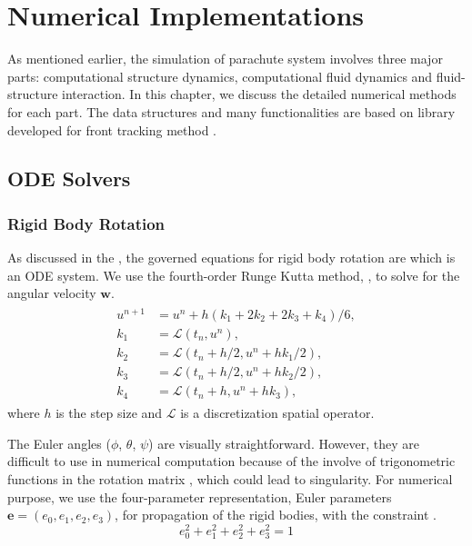 \chapter{Numerical Implementations}
\label{Chap:Numerical}

As mentioned earlier, the simulation of parachute system involves three 
major parts: computational structure dynamics, computational fluid 
dynamics and fluid-structure interaction. 
In this chapter, we discuss the detailed numerical methods for each part. 
The data structures and many functionalities are based on \FronTierp 
library developed for front tracking method \cite{GliGroLi99a,DuFixGli05}.



\section{ODE Solvers}
\label{Sec:ODES}

\subsection{Rigid Body Rotation}
As discussed in the , the governed equations for rigid body 
rotation are  which is an ODE system. 
We use the fourth-order Runge Kutta method, , to solve for the 
angular velocity $\mathbf{w}$. 
\begin{eqnarray}
\begin{aligned}
u^{n+1} &= u^{n} + h(k_{1} + 2k_{2} + 2k_{3} + k_{4})/6, \\
k_{1} &= \mathscr{L}(t_n, u^{n}), \\
k_{2} &= \mathscr{L}(t_n + h/2, u^{n} + hk_{1}/2), \\
k_{3} &= \mathscr{L}(t_n + h/2, u^{n} + hk_{2}/2), \\
k_{4} &= \mathscr{L}(t_n + h, u^{n} + hk_{3}),
\end{aligned}
\label{eqn:4th_RK}
\end{eqnarray}
where $h$ is the step size and $\mathscr{L}$ is a discretization spatial
operator.

The Euler angles ($\phi$, $\theta$, $\psi$) are visually straightforward.
However, they are difficult to use in numerical computation because of the
involve of trigonometric functions in the rotation matrix 
, which could lead to singularity.
For numerical purpose, we use the four-parameter representation, Euler 
parameters $\mathbf{e} = (e_{0}, e_{1}, e_{2}, e_{3})$, for propagation 
of the rigid bodies, with the constraint . 
\begin{equation}
e_0^2 + e_1^2 + e_2^2 + e_3^2 = 1
\label{eqn:Euler_params_constraint}
\end{equation}

